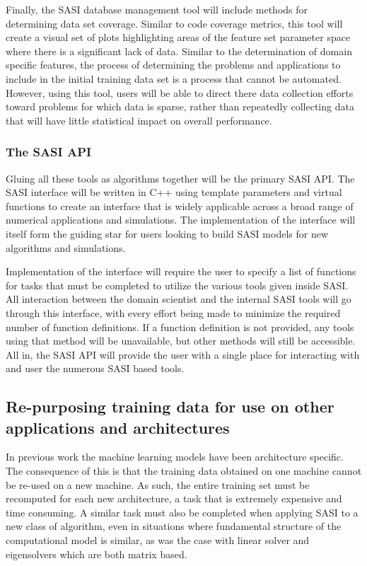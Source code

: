 Finally, the SASI database management tool will include methods for determining data set coverage. Similar to code coverage metrics, this tool will create a visual set of plots highlighting areas of the feature set parameter space where there is a significant lack of data.  Similar to the determination of domain specific features, the process of determining the problems and applications to include in the initial training data set is a process that cannot be automated. However, using this tool, users will be able to direct there data collection efforts toward problems for which data is sparse, rather than repeatedly collecting data that will have little statistical impact on overall performance. 
  
\subsubsection{The SASI API} 
Gluing all these tools as algorithms together will be the primary SASI API. The SASI interface will be written in C++ using template parameters and virtual functions to create an interface that is widely applicable across a broad range of numerical applications and simulations. The implementation of the interface will itself form the guiding star for users looking to build SASI models for new algorithms and simulations. 

Implementation of the interface will require the user to specify a list of functions for tasks that must be completed to utilize the various tools given inside SASI. All interaction between the domain scientist and the internal SASI tools will go through this interface, with every effort being made to minimize the required number of function definitions. If a function definition is not provided, any tools using that method will be unavailable, but other methods will still be accessible. All in, the SASI API will provide the user with a single place for interacting with and user the numerous SASI based tools. 

\subsection{ Re-purposing training data for use on other applications and architectures }

In previous work the machine learning models have been architecture specific. The consequence of this is that the training data 
obtained on one machine cannot be re-used on a new machine. As such, the entire training set must be recomputed for each new architecture, a task 
that is extremely expensive and time consuming. A similar task must also be completed when applying SASI to a new class of algorithm, even in situations where fundamental structure of the computational model is similar, as was the case with linear solver and eigensolvers which are both matrix based. 

